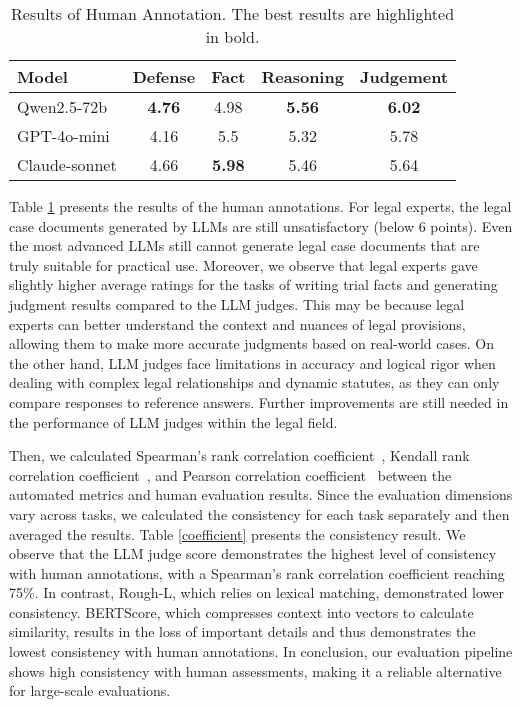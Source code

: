 \begin{table}[t]
\small
\centering
\begin{tabular}{lcccc}
\hline
Model                & Defense       & Fact          & Reasoning     & Judgement     \\ \hline
Qwen2.5-72b & \textbf{4.76} & 4.98          & \textbf{5.56} & \textbf{6.02} \\
GPT-4o-mini          & 4.16          & 5.5           & 5.32          & 5.78          \\
Claude-sonnet        & 4.66          & \textbf{5.98} & 5.46          & 5.64          \\ \hline
\end{tabular}
\caption{Results of Human Annotation. The best results are highlighted in bold.}
\label{human}
\end{table}


Table \ref{human} presents the results of the human annotations.
For legal experts, the legal case documents generated by LLMs are still unsatisfactory (below 6 points). 
Even the most advanced LLMs still cannot generate legal case documents that are truly suitable for practical use.
Moreover, we observe that legal experts gave slightly higher average ratings for the tasks of writing trial facts and generating judgment results compared to the LLM judges.
This may be because legal experts can better understand the context and nuances of legal provisions, allowing them to make more accurate judgments based on real-world cases.
On the other hand, LLM judges face limitations in accuracy and logical rigor when dealing with complex legal relationships and dynamic statutes, as they can only compare responses to reference answers.
Further improvements are still needed in the performance of LLM judges within the legal field.


Then, we calculated Spearman's rank correlation coefficient~\cite{zar2005spearman}, Kendall rank correlation coefficient~\cite{abdi2007kendall}, and Pearson correlation coefficient~\cite{sedgwick2012pearson} between the automated metrics and human evaluation results. 
Since the evaluation dimensions vary across tasks, we calculated the consistency for each task separately and then averaged the results.
Table \ref{coefficient} presents the consistency result.
We observe that the LLM judge score demonstrates the highest level of consistency with human annotations, with a Spearman's rank correlation coefficient reaching 75\%. 
In contrast, Rough-L, which relies on lexical matching, demonstrated lower consistency.
BERTScore, which compresses context into vectors to calculate similarity, results in the loss of important details and thus demonstrates the lowest consistency with human annotations.
In conclusion, our evaluation pipeline shows high consistency with human assessments, making it a reliable alternative for large-scale evaluations.


